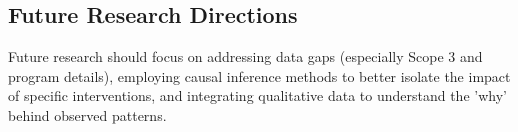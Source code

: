 \documentclass[11pt,a4paper]{article}
\begin{document}
\subsection{Future Research Directions}
Future research should focus on addressing data gaps (especially Scope 3 and program details), employing causal inference methods to better isolate the impact of specific interventions, and integrating qualitative data to understand the 'why' behind observed patterns.
\end{document}
